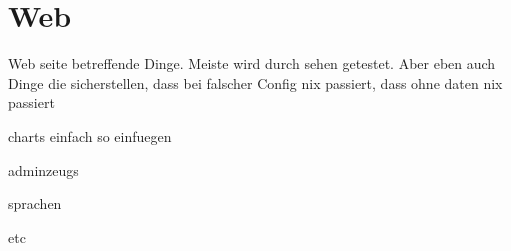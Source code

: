 \section{Web}
Web seite betreffende Dinge.
Meiste wird durch sehen getestet.
Aber eben auch Dinge die sicherstellen, dass bei falscher Config nix passiert,
dass ohne daten nix passiert

charts einfach so einfuegen

adminzeugs

sprachen

etc


